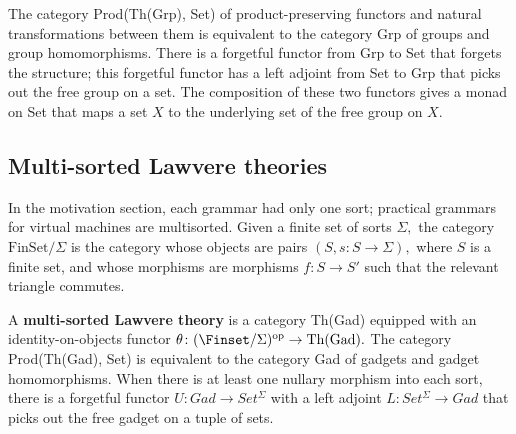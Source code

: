 \documentclass{article}
\newcommand{\maps}{\colon}
\newcommand{\FinSet}{\mathrm{FinSet}}
\newcommand{\op}{\mathrm{op}}
\begin{document}
The category Prod(Th(Grp), Set) of product-preserving functors and natural transformations between them is equivalent to the category Grp of groups and group homomorphisms.  There is a forgetful functor from Grp to Set that forgets the structure; this forgetful functor has a left adjoint from Set to Grp that picks out the free group on a set.  The composition of these two functors gives a monad on Set that maps a set $X$ to the underlying set of the free group on $X.$

\subsection{Multi-sorted Lawvere theories}
In the motivation section, each grammar had only one sort; practical grammars for virtual machines are multisorted.    Given a finite set of sorts $\Sigma,$ the category $\FinSet/\Sigma$ is the category whose objects are pairs $(S, s\maps S\to \Sigma),$ where $S$ is a finite set, and whose morphisms are morphisms $f\maps S \to S'$ such that the relevant triangle commutes.

A {\bf multi-sorted Lawvere theory} is a category Th(Gad) equipped with an identity-on-objects functor $\theta\maps (\Finset/\Sigma)^\op \to \mathrm{Th(Gad)}.$  The category Prod(Th(Gad), Set) is equivalent to the category Gad of gadgets and gadget homomorphisms.  When there is at least one nullary morphism into each sort, there is a forgetful functor $U\maps Gad \to Set^\Sigma$ with a left adjoint $L\maps Set^\Sigma \to Gad$ that picks out the free gadget on a tuple of sets.
\end{document}
